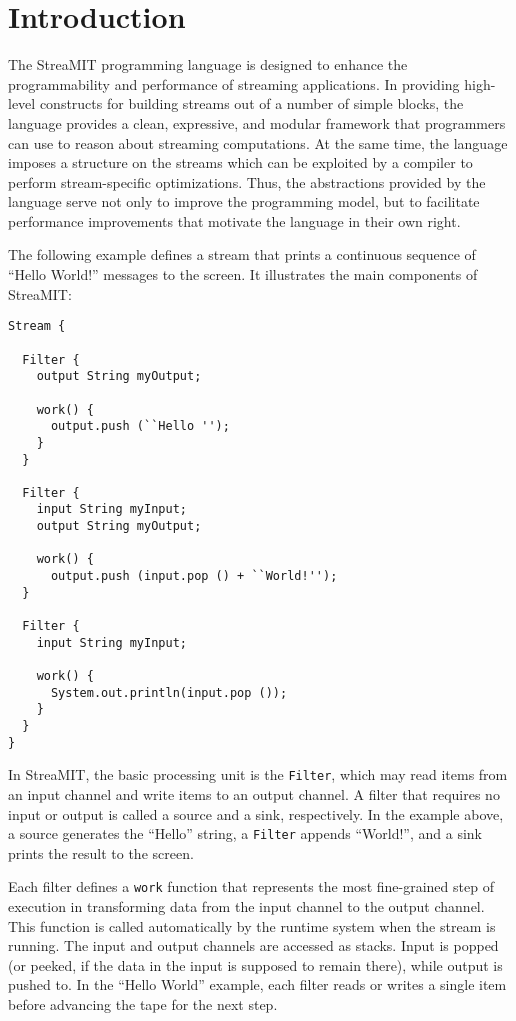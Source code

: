 \section{Introduction}
\label{sec:intro}

The StreaMIT programming language is designed to enhance the
programmability and performance of streaming applications.  In
providing high-level constructs for building streams out of a number
of simple blocks, the language provides a clean, expressive, and
modular framework that programmers can use to reason about streaming
computations.  At the same time, the language imposes a structure on
the streams which can be exploited by a compiler to perform
stream-specific optimizations.  Thus, the abstractions provided by the
language serve not only to improve the programming model, but to
facilitate performance improvements that motivate the language in
their own right.

The following example defines a stream that prints a continuous
sequence of ``Hello World!'' messages to the screen.  It illustrates
the main components of StreaMIT:

\begin{verbatim}
Stream {

  Filter {
    output String myOutput;

    work() {
      output.push (``Hello '');
    }
  }

  Filter {
    input String myInput;
    output String myOutput;

    work() {
      output.push (input.pop () + ``World!'');
  }

  Filter {
    input String myInput;
    
    work() {
      System.out.println(input.pop ());
    }
  }
}
\end{verbatim}

In StreaMIT, the basic processing unit is the {\tt Filter}, which
may read items from an input channel and write items to an output
channel.  A filter that requires no input or output is called a
source and a sink, respectively.  In the example above, a 
source generates the ``Hello'' string, a {\tt Filter} appends
``World!'', and a sink prints the result to the screen.

Each filter defines a {\tt work} function that represents the most
fine-grained step of execution in transforming data from the input
channel to the output channel.  This function is called automatically
by the runtime system when the stream is running.  The input and
output channels are accessed as stacks.  Input is popped (or peeked, if
the data in the input is supposed to remain there),
while output is pushed to.  In the ``Hello World'' example, each 
filter reads or writes a single item before advancing the tape for 
the next step.


